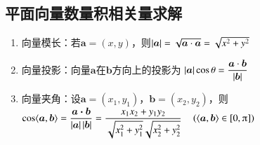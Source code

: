   \subsection{平面向量数量积相关量求解}
    \begin{enumerate}[label=\arabic*)]
      \item 向量模长：若$\bm a=(x,y)$，则$\left| \bm a \right|=\sqrt{\bm a\cdot\bm a}=\sqrt{x^2+y^2}$
      \item 向量投影：向量$\bm a$在$\bm b$方向上的投影为
        $\left| \bm{a} \right|\cos\theta=\dfrac{\bm a\cdot\bm b}{\left| \bm b \right|}$
      \item 向量夹角：设$\bm a=(x_1,y_1)$，$\bm b=(x_2,y_2)$，则
        $\cos\vangle{\bm a}{\bm b}=\dfrac{\bm{a}\bm{\cdot}\bm{b}}{\abs{\bm{a}}\abs{\bm{b}}}=\dfrac{x_1x_2+y_1y_2}{\sqrt{x_1^2+y_1^2}\sqrt{x_2^2+y_2^2}} \quad \left(\vangle{\bm a}{\bm b}\in\left[0,\piup\right]\right)$
    \end{enumerate}
  \clearpage
